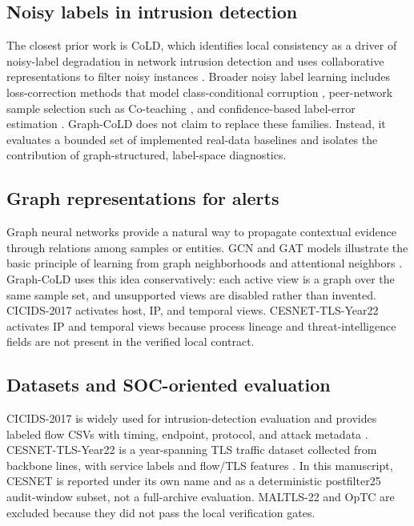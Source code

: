 \documentclass[preprint,review,12pt]{elsarticle}
\begin{document}
\subsection{Noisy labels in intrusion detection}
The closest prior work is CoLD, which identifies local consistency as a driver
of noisy-label degradation in network intrusion detection and uses collaborative
representations to filter noisy instances \cite{yang2026cold}. Broader noisy
label learning includes loss-correction methods that model class-conditional
corruption \cite{patrini2017loss}, peer-network sample selection such as
Co-teaching \cite{han2018coteaching}, and confidence-based label-error
estimation \cite{northcutt2021confident}. Graph-CoLD does not claim to replace
these families. Instead, it evaluates a bounded set of implemented real-data
baselines and isolates the contribution of graph-structured, label-space
diagnostics.

\subsection{Graph representations for alerts}
Graph neural networks provide a natural way to propagate contextual evidence
through relations among samples or entities. GCN and GAT models illustrate the
basic principle of learning from graph neighborhoods and attentional neighbors
\cite{kipf2017gcn,velickovic2018gat}. Graph-CoLD uses this idea conservatively:
each active view is a graph over the same sample set, and unsupported views are
disabled rather than invented. CICIDS-2017 activates host, IP, and temporal
views. CESNET-TLS-Year22 activates IP and temporal views because process lineage
and threat-intelligence fields are not present in the verified local contract.

\subsection{Datasets and SOC-oriented evaluation}
CICIDS-2017 is widely used for intrusion-detection evaluation and provides
labeled flow CSVs with timing, endpoint, protocol, and attack metadata
\cite{sharafaldin2018cicids}. CESNET-TLS-Year22 is a year-spanning TLS traffic
dataset collected from backbone lines, with service labels and flow/TLS features
\cite{hynek2024cesnettlsyear22,cesnettlsyear22}. In this manuscript, CESNET is
reported under its own name and as a deterministic postfilter25 audit-window
subset, not a full-archive evaluation. MALTLS-22 and OpTC are excluded because
they did not pass the local verification gates.
\end{document}

